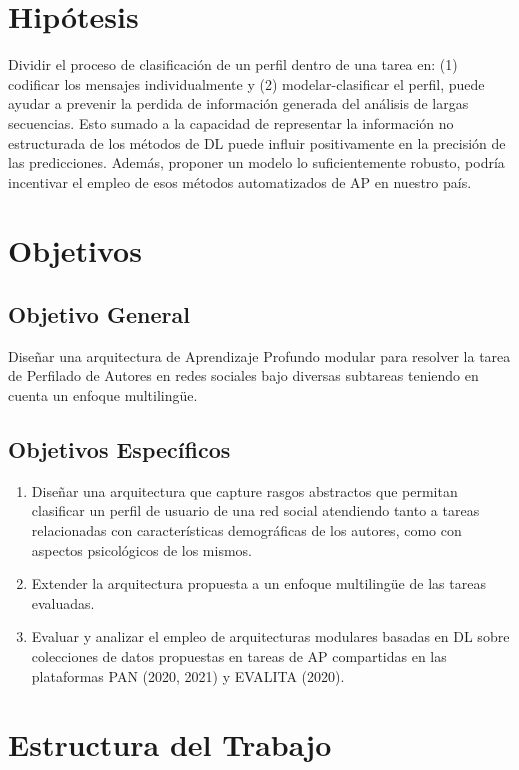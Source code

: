 \section*{Hipótesis}


Dividir el proceso de clasificación de un perfil dentro de una tarea en: (1) codificar los mensajes individualmente y (2) modelar-clasificar el perfil, puede ayudar a prevenir la perdida de información generada del análisis de largas secuencias. Esto sumado a la capacidad de representar la información no estructurada de los métodos de DL puede influir positivamente en la precisión de las predicciones.  Además, proponer un modelo lo suficientemente robusto, podría incentivar el empleo de esos métodos automatizados  de AP en nuestro país.

\section*{Objetivos}
\subsection*{Objetivo General}

Diseñar una arquitectura de Aprendizaje Profundo modular para resolver la tarea de Perfilado de Autores en redes sociales bajo diversas subtareas teniendo en cuenta un enfoque multilingüe.
\subsection*{Objetivos Específicos}
\begin{enumerate}
	\item Diseñar una arquitectura que capture rasgos abstractos que permitan clasificar un perfil de usuario de una red social atendiendo tanto a tareas relacionadas con características demográficas de los autores, como con aspectos psicológicos de los mismos.
	\item Extender la arquitectura propuesta a un enfoque multilingüe de las tareas evaluadas.
	\item Evaluar y analizar el empleo de arquitecturas modulares basadas en DL sobre colecciones de datos propuestas en tareas de AP compartidas en las plataformas PAN (2020, 2021) y EVALITA (2020).
\end{enumerate}

\section*{Estructura del Trabajo}

